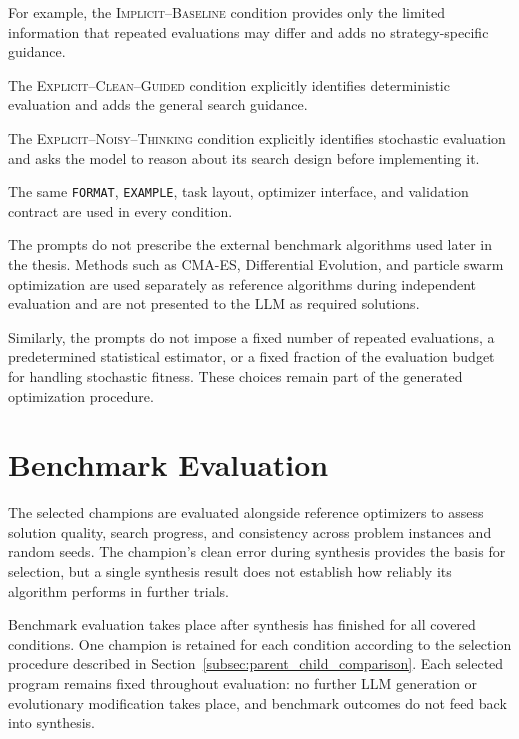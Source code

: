 For example, the \textsc{Implicit--Baseline} condition provides only the
limited information that repeated evaluations may differ and adds no
strategy-specific guidance.

The \textsc{Explicit--Clean--Guided} condition explicitly identifies
deterministic evaluation and adds the general search guidance.

The \textsc{Explicit--Noisy--Thinking} condition explicitly identifies
stochastic evaluation and asks the model to reason about its search design
before implementing it.

The same \texttt{FORMAT}, \texttt{EXAMPLE}, task layout, optimizer interface,
and validation contract are used in every condition.

The prompts do not prescribe the external benchmark algorithms used later in
the thesis. Methods such as CMA-ES, Differential Evolution, and particle
swarm optimization are used separately as reference algorithms during
independent evaluation and are not presented to the LLM as required
solutions.

Similarly, the prompts do not impose a fixed number of repeated evaluations,
a predetermined statistical estimator, or a fixed fraction of the evaluation
budget for handling stochastic fitness. These choices remain part of the
generated optimization procedure.

\section{Benchmark Evaluation}
\label{sec:benchmark_method}

The selected champions are evaluated alongside reference optimizers to
assess solution quality, search progress, and consistency across problem
instances and random seeds. The champion's clean error during synthesis
provides the basis for selection, but a single synthesis result does not
establish how reliably its algorithm performs in further trials.

Benchmark evaluation takes place after synthesis has finished for all
covered conditions. One champion is retained for each condition according
to the selection procedure described in
Section~\ref{subsec:parent_child_comparison}.
Each selected program remains fixed throughout evaluation: no further LLM
generation or evolutionary modification takes place, and benchmark outcomes
do not feed back into synthesis.


